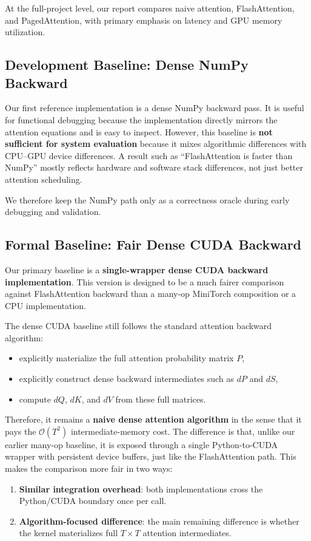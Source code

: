 \documentclass{article}
\begin{document}
At the full-project level, our report compares naive attention, FlashAttention, and PagedAttention, with primary emphasis on latency and GPU memory utilization.

\subsection{Development Baseline: Dense NumPy Backward}

Our first reference implementation is a dense NumPy backward pass. It is useful for functional debugging because the implementation directly mirrors the attention equations and is easy to inspect. However, this baseline is \textbf{not sufficient for system evaluation} because it mixes algorithmic differences with CPU--GPU device differences. A result such as ``FlashAttention is faster than NumPy'' mostly reflects hardware and software stack differences, not just better attention scheduling.

We therefore keep the NumPy path only as a correctness oracle during early debugging and validation.

\subsection{Formal Baseline: Fair Dense CUDA Backward}

Our primary baseline is a \textbf{single-wrapper dense CUDA backward implementation}. This version is designed to be a much fairer comparison against FlashAttention backward than a many-op MiniTorch composition or a CPU implementation.

The dense CUDA baseline still follows the standard attention backward algorithm:
\begin{itemize}
    \item explicitly materialize the full attention probability matrix $P$,
    \item explicitly construct dense backward intermediates such as $dP$ and $dS$,
    \item compute $dQ$, $dK$, and $dV$ from these full matrices.
\end{itemize}

Therefore, it remains a \textbf{naive dense attention algorithm} in the sense that it pays the $\mathcal{O}(T^2)$ intermediate-memory cost. The difference is that, unlike our earlier many-op baseline, it is exposed through a single Python-to-CUDA wrapper with persistent device buffers, just like the FlashAttention path. This makes the comparison more fair in two ways:
\begin{enumerate}
    \item \textbf{Similar integration overhead}: both implementations cross the Python/CUDA boundary once per call.
    \item \textbf{Algorithm-focused difference}: the main remaining difference is whether the kernel materializes full $T \times T$ attention intermediates.
\end{enumerate}
\end{document}
